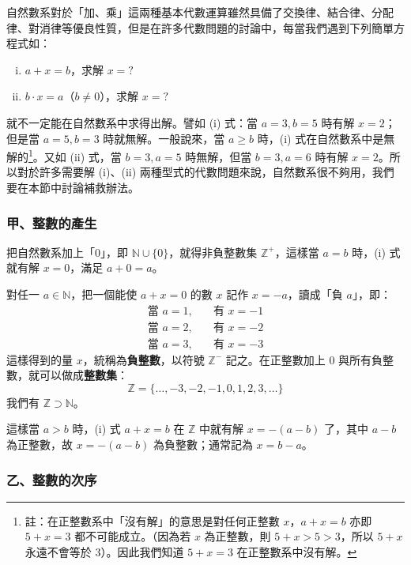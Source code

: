 自然數系對於「加、乘」這兩種基本代數運算雖然具備了交換律、結合律、分配律、對消律等優良性質，但是在許多代數問題的討論中，每當我們遇到下列簡單方程式如：
\begin{enumerate}[(i)]
  \item $a+x=b$，求解 $x=?$
  \item $b \cdot x = a$（$b \neq 0$），求解 $x=?$
\end{enumerate}
就不一定能在自然數系中求得出解。譬如 (i) 式：當 $a=3, b=5$ 時有解 $x=2$；但是當 $a=5, b=3$ 時就無解。一般說來，當 $a \ge b$ 時，(i) 式在自然數系中是無解的\footnote{註：在正整數系中「沒有解」的意思是對任何正整數 $x$，$a+x=b$ 亦即 $5+x=3$ 都不可能成立。（因為若 $x$ 為正整數，則 $5+x > 5 > 3$，所以 $5+x$ 永遠不會等於 $3$）。因此我們知道 $5+x=3$ 在正整數系中沒有解。}。又如 (ii) 式，當 $b=3, a=5$ 時無解，但當 $b=3, a=6$ 時有解 $x=2$。所以對於許多需要解 (i)、(ii) 兩種型式的代數問題來說，自然數系很不夠用，我們要在本節中討論補救辦法。

\subsubsection*{甲、整數的產生}\label{subsec:int_generation}

把自然數系加上「$0$」，即 $\mathbb{N} \cup \{0\}$，就得非負整數集 $\mathbb{Z}^+$，這樣當 $a=b$ 時，(i) 式就有解 $x=0$，滿足 $a+0=a$。

對任一 $a \in \mathbb{N}$，把一個能使 $a+x=0$ 的數 $x$ 記作 $x = -a$，讀成「負 $a$」，即：
\begin{align*}
  \text{當 } a = 1, \quad &\text{有 } x = -1 \\
  \text{當 } a = 2, \quad &\text{有 } x = -2 \\
  \text{當 } a = 3, \quad &\text{有 } x = -3
\end{align*}
這樣得到的量 $x$，統稱為\textbf{負整數}，以符號 $\mathbb{Z}^-$ 記之。在正整數加上 $0$ 與所有負整數，就可以做成\textbf{整數集}：
\begin{equation}\label{eq:integers_set}
  \mathbb{Z} = \{\dots, -3, -2, -1, 0, 1, 2, 3, \dots\}
\end{equation}
我們有 $\mathbb{Z} \supset \mathbb{N}$。

這樣當 $a > b$ 時，(i) 式 $a+x=b$ 在 $\mathbb{Z}$ 中就有解 $x = -(a-b)$ 了，其中 $a-b$ 為正整數，故 $x = -(a-b)$ 為負整數；通常記為 $x = b - a$。

\subsubsection*{乙、整數的次序}\label{subsec:int_order}

